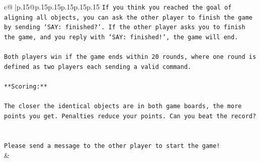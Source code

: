 \documentclass{article}
\begin{document}
{\begin{supertabular}{c@{$\;$}|p{.15\linewidth}@{}p{.15\linewidth}p{.15\linewidth}p{.15\linewidth}p{.15\linewidth}p{.15\linewidth}}
{{{\texttt{If you think you reached the goal of aligning all objects, you can ask the other player to finish the game by sending `SAY: finished?`. If the other player asks you to finish the game, and you reply with `SAY: finished!`, the game will end.} \\
\\ 
\texttt{Both players win if the game ends within 20 rounds, where one round is defined as two players each sending a valid command.} \\
\\ 
\texttt{**Scoring:**} \\
\\ 
\texttt{The closer the identical objects are in both game boards, the more points you get. Penalties reduce your points. Can you beat the record?} \\
\\ 
\\ 
\texttt{Please send a message to the other player to start the game!} \\
            }
        }
    }
    & \\ \\


\end{supertabular}}
\end{document}
